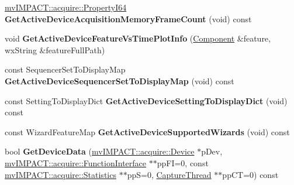 \begin{DoxyCompactItemize}
\item 
\hypertarget{class_device_property_handler_a50c974f244606b004c0aa3d27edfd184}{\hyperlink{group___common_interface_ga81749b2696755513663492664a18a893}{mv\+I\+M\+P\+A\+C\+T\+::acquire\+::\+Property\+I64} {\bfseries Get\+Active\+Device\+Acquisition\+Memory\+Frame\+Count} (void) const }\label{class_device_property_handler_a50c974f244606b004c0aa3d27edfd184}

\item 
\hypertarget{class_device_property_handler_aaad90f528b0cac22a937d81a54f6a834}{void {\bfseries Get\+Active\+Device\+Feature\+Vs\+Time\+Plot\+Info} (\hyperlink{classmv_i_m_p_a_c_t_1_1acquire_1_1_component}{Component} \&feature, wx\+String \&feature\+Full\+Path)}\label{class_device_property_handler_aaad90f528b0cac22a937d81a54f6a834}

\item 
\hypertarget{class_device_property_handler_a125eef402d7be52c482536afb9d32683}{const Sequencer\+Set\+To\+Display\+Map {\bfseries Get\+Active\+Device\+Sequencer\+Set\+To\+Display\+Map} (void) const }\label{class_device_property_handler_a125eef402d7be52c482536afb9d32683}

\item 
\hypertarget{class_device_property_handler_a3e2d2398425ab607299b5c98dc94b5e3}{const Setting\+To\+Display\+Dict {\bfseries Get\+Active\+Device\+Setting\+To\+Display\+Dict} (void) const }\label{class_device_property_handler_a3e2d2398425ab607299b5c98dc94b5e3}

\item 
\hypertarget{class_device_property_handler_ae2e87d1216a0c0770f254179ec6de1a5}{const Wizard\+Feature\+Map {\bfseries Get\+Active\+Device\+Supported\+Wizards} (void) const }\label{class_device_property_handler_ae2e87d1216a0c0770f254179ec6de1a5}

\item 
\hypertarget{class_device_property_handler_a72ba0c7287b4e174318e72506101b3a3}{bool {\bfseries Get\+Device\+Data} (\hyperlink{classmv_i_m_p_a_c_t_1_1acquire_1_1_device}{mv\+I\+M\+P\+A\+C\+T\+::acquire\+::\+Device} $\ast$p\+Dev, \hyperlink{classmv_i_m_p_a_c_t_1_1acquire_1_1_function_interface}{mv\+I\+M\+P\+A\+C\+T\+::acquire\+::\+Function\+Interface} $\ast$$\ast$pp\+F\+I=0, const \hyperlink{classmv_i_m_p_a_c_t_1_1acquire_1_1_statistics}{mv\+I\+M\+P\+A\+C\+T\+::acquire\+::\+Statistics} $\ast$$\ast$pp\+S=0, \hyperlink{class_capture_thread}{Capture\+Thread} $\ast$$\ast$pp\+C\+T=0) const }\label{class_device_property_handler_a72ba0c7287b4e174318e72506101b3a3}


\end{DoxyCompactItemize}
